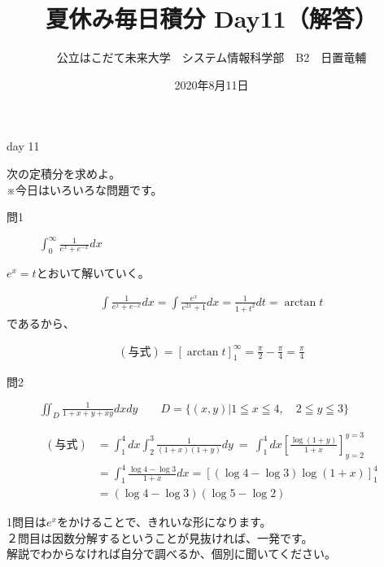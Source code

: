 \documentclass[dvipdfmx,uplatex]{jsarticle}
\title{夏休み毎日積分 Day11（解答）}
\author{公立はこだて未来大学　システム情報科学部　B2　日置竜輔}
\date{2020年8月11日}
\begin{document}
\maketitle

\begin{itembox}{day 11 }
    \begin{center}
        次の定積分を求めよ。\\
        ※今日はいろいろな問題です。
    \end{center}
\end{itembox}

\begin{description}
    \item [問1] $\displaystyle \int_0^\infty \frac{1}{e^x + e^{-x}} dx$
\end{description}

$ \displaystyle e^x = t$とおいて解いていく。

\begin{align*}
    \int \frac{1}{e^x+e^{-x}} dx = \int \frac{e^x}{e^{2x}+1}dx = \frac{1}{1+t^2}dt
    = \arctan{t}
\end{align*}
であるから、

\begin{align*}
    (与式) =  \left[\arctan{t}\right]_1^{\infty} = \frac{\pi}{2} - \frac{\pi}{4} = \frac{\pi}{4}
\end{align*}

\begin{description}
    \item [問2] $\displaystyle \iint_D \frac{1}{1+x+y+xy}  dxdy \qquad D = \{(x,y) | 1 \leqq x \leqq 4, \quad 2 \leqq y \leqq 3\}$
\end{description}

\begin{align*}
    (与式) &= \int_1^4 dx \int_2^3 \frac{1}{(1+x)(1+y)}dy ~=~ \int_1^4dx \left[\frac{\log(1+y)}{1+x}\right]_{y = 2}^{y = 3} \\
    &= \int_1^4 \frac{\log{4} - \log{3}}{1+x}dx = \left[\left( \log{4}-\log{3} \right)\log\left(1+x\right)\right]_1^4 \\
    &= \left(\log{4}-\log{3}\right)\left(\log{5}-\log{2}\right)
\end{align*}

\begin{boxnote}
    \begin{center}
        1問目は$e^x$をかけることで、きれいな形になります。\\
        ２問目は因数分解するということが見抜ければ、一発です。\\
        解説でわからなければ自分で調べるか、個別に聞いてください。
    \end{center}
\end{boxnote}
\end{document}
